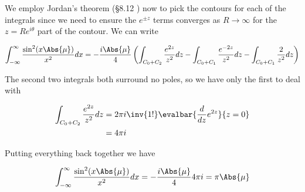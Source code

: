 We employ Jordan's theorem (\S 8.12 \cite{lepage1980cva}) now to pick the contours for each of the integrals since we need to ensure the $e^{\pm z}$ terms converges as $R \rightarrow \infty$ for the $z = R e^{i\theta}$ part of the contour.  We can write

\begin{equation}\label{eqn:sincIntegral:30}
\int_{-\infty}^\infty \frac{\sin^2 (x\Abs{\mu})}{x^2} dx
=
-\frac{i \Abs{\mu}}{4} \left(
\int_{C_0 + C_2} \frac{e^{2z}}{z^2} dz
-\int_{C_0 + C_1} \frac{e^{-2z}}{z^2} dz
-\int_{C_0 + C_1} \frac{2}{z^2} dz
\right)
\end{equation}

The second two integrals both surround no poles, so we have only the first to deal with

\begin{align*}
\int_{C_0 + C_2} \frac{e^{2z}}{z^2} dz
&= 2 \pi i \inv{1!} \evalbar{ \frac{d}{dz} e^{2z}}{z=0} \\
&= 4 \pi i 
\end{align*}

Putting everything back together we have

\begin{equation}\label{eqn:sincIntegral:50}
\int_{-\infty}^\infty \frac{\sin^2 (x\Abs{\mu})}{x^2} dx
= 
-\frac{i \Abs{\mu}}{4} 4 \pi i 
= \pi \Abs{\mu}
\end{equation}

\EndArticle
